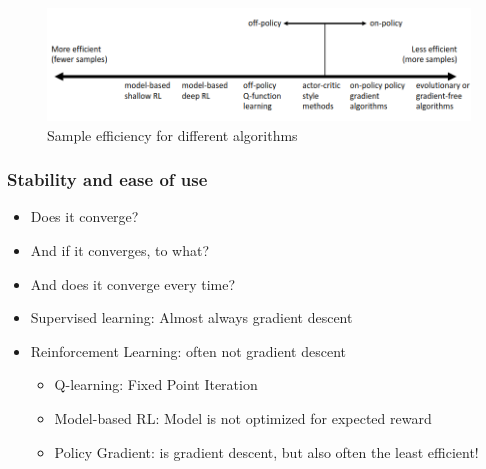 \documentclass[]{article}
\begin{document}
\begin{figure}
\begin{center}
    \includegraphics[scale=0.5]{cap3img/comparison.png}
\end{center}
\caption{Sample efficiency for different algorithms}
\label{fig:comparison}
\end{figure}

\subsubsection*{Stability and ease of use}
\label{sub:Stability and ease of use}

\begin{itemize}
    \item Does it converge? 
    \item And if it converges, to what?
    \item And does it converge every time?
    \item Supervised learning: Almost always gradient descent
    \item Reinforcement Learning: often not gradient descent
        \begin{itemize}
            \item Q-learning: Fixed Point Iteration
            \item Model-based RL: Model is not optimized for expected reward
            \item Policy Gradient: is gradient descent, but also often the least  efficient!
        \end{itemize}
\end{itemize}
\end{document}
